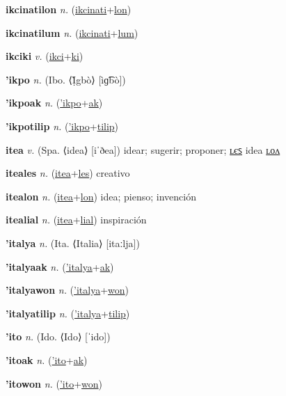 \textbf{\hypertarget{ikcinatilon}{ikcinatilon}} \textit{n.} (\hyperlink{ikcinati}{ikcinati}+\allowbreak \hyperlink{lon}{lon})


\textbf{\hypertarget{ikcinatilum}{ikcinatilum}} \textit{n.} (\hyperlink{ikcinati}{ikcinati}+\allowbreak \hyperlink{lum}{lum})


\textbf{\hypertarget{ikciki}{ikciki}} \textit{v.} (\hyperlink{ikci}{ikci}+\allowbreak \hyperlink{ki}{ki})


\textbf{\hypertarget{'ikpo}{'ikpo}} \textit{n.} (Ibo. ⟨Ị̀gbò⟩ [ìɡ͡bò])


\textbf{\hypertarget{'ikpoak}{'ikpoak}} \textit{n.} (\hyperlink{'ikpo}{'ikpo}+\allowbreak \hyperlink{ak}{ak})


\textbf{\hypertarget{'ikpotilip}{'ikpotilip}} \textit{n.} (\hyperlink{'ikpo}{'ikpo}+\allowbreak \hyperlink{tilip}{tilip})


\textbf{\hypertarget{itea}{itea}} \textit{v.} (Spa. ⟨idea⟩ [iˈðea])
idear; sugerir; proponer; \hyperlink{iteales}{ʟєꜱ} idea \hyperlink{itealon}{ʟᴏᴧ}

\textbf{\hypertarget{iteales}{iteales}} \textit{n.} (\hyperlink{itea}{itea}+\allowbreak \hyperlink{les}{les})
creativo

\textbf{\hypertarget{itealon}{itealon}} \textit{n.} (\hyperlink{itea}{itea}+\allowbreak \hyperlink{lon}{lon})
idea; pienso; invención

\textbf{\hypertarget{itealial}{itealial}} \textit{n.} (\hyperlink{itea}{itea}+\allowbreak \hyperlink{lial}{lial})
inspiración

\textbf{\hypertarget{'italya}{'italya}} \textit{n.} (Ita. ⟨Italia⟩ [itaːlja])


\textbf{\hypertarget{'italyaak}{'italyaak}} \textit{n.} (\hyperlink{'italya}{'italya}+\allowbreak \hyperlink{ak}{ak})


\textbf{\hypertarget{'italyawon}{'italyawon}} \textit{n.} (\hyperlink{'italya}{'italya}+\allowbreak \hyperlink{won}{won})


\textbf{\hypertarget{'italyatilip}{'italyatilip}} \textit{n.} (\hyperlink{'italya}{'italya}+\allowbreak \hyperlink{tilip}{tilip})


\textbf{\hypertarget{'ito}{'ito}} \textit{n.} (Ido. ⟨Ido⟩ [ˈido])


\textbf{\hypertarget{'itoak}{'itoak}} \textit{n.} (\hyperlink{'ito}{'ito}+\allowbreak \hyperlink{ak}{ak})


\textbf{\hypertarget{'itowon}{'itowon}} \textit{n.} (\hyperlink{'ito}{'ito}+\allowbreak \hyperlink{won}{won})


